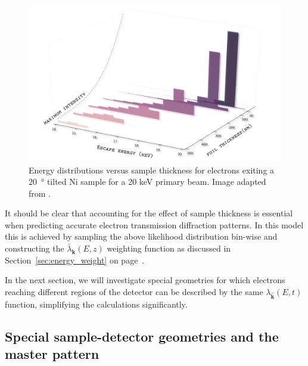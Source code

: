 \begin{figure}[ht]
\centering
\includegraphics[width=1.\linewidth]{Figures/TKD_escapeE.png}
\caption[Energy distributions versus sample thickness.]{Energy distributions versus sample thickness for electrons exiting a \SI{20}{\degree}  tilted Ni sample for a 20 keV primary beam. Image adapted from \cite{PascalTKD}.  }
\label{fig:TKDescapeE}
\end{figure}



It should be clear that accounting for the effect of sample thickness is essential when predicting accurate electron transmission diffraction patterns. In this model this is achieved by sampling the above likelihood distribution bin-wise and constructing the $\bar{\lambda}_{\mathbf{k}}(E,z)$ weighting function as discussed in Section~\ref{sec:energy_weight} on page~\pageref{sec:energy_weight}.

In the next section, we will investigate special geometries for which electrons reaching different regions of the detector can be described by the same $\lambda_{\hat{\mathbf{k}}}(E,t)$ function, simplifying the calculations significantly. 



%
\subsection{Special sample-detector geometries and the master pattern}
\label{sec:geom}


